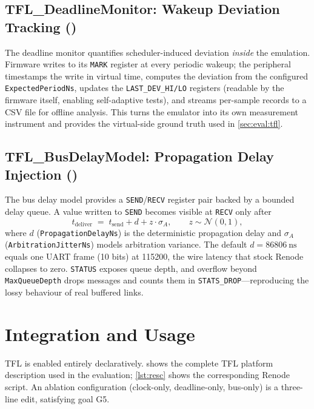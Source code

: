 \subsection{TFL\_DeadlineMonitor: Wakeup Deviation Tracking ()}
\label{sec:design:monitor}

The deadline monitor quantifies scheduler-induced deviation
\emph{inside} the emulation. Firmware writes to its \texttt{MARK}
register at every periodic wakeup; the peripheral timestamps the write
in virtual time, computes the deviation from the configured
\texttt{ExpectedPeriodNs}, updates the \texttt{LAST\_DEV\_HI/LO}
registers (readable by the firmware itself, enabling self-adaptive
tests), and streams per-sample records to a CSV file for offline
analysis. This turns the emulator into its own measurement instrument
and provides the virtual-side ground truth used in
\cref{sec:eval:tfl}.

\subsection{TFL\_BusDelayModel: Propagation Delay Injection ()}
\label{sec:design:bus}

The bus delay model provides a \texttt{SEND}/\texttt{RECV} register
pair backed by a bounded delay queue. A value written to \texttt{SEND}
becomes visible at \texttt{RECV} only after
%
\begin{equation}
  t_{\mathrm{deliver}} \;=\; t_{\mathrm{send}} + d + z\cdot\sigma_A,
  \qquad z\sim\mathcal{N}(0,1),
\end{equation}
%
where $d$ (\texttt{PropagationDelayNs}) is the deterministic
propagation delay and $\sigma_A$ (\texttt{ArbitrationJitterNs}) models
arbitration variance. The default $d = \SI{86806}{\nano\second}$ equals
one UART frame (10 bits) at \SI{115200}{\baud}, the wire latency that
stock Renode collapses to zero. \texttt{STATUS} exposes queue depth,
and overflow beyond \texttt{MaxQueueDepth} drops messages and counts
them in \texttt{STATS\_DROP}---reproducing the lossy behaviour of real
buffered links.

\section{Integration and Usage}
\label{sec:design:integration}

TFL is enabled entirely declaratively.
 shows the complete TFL platform description used in the
evaluation; \cref{lst:resc} shows the corresponding Renode script. An
ablation configuration (clock-only, deadline-only, bus-only) is a
three-line edit, satisfying goal G5.

